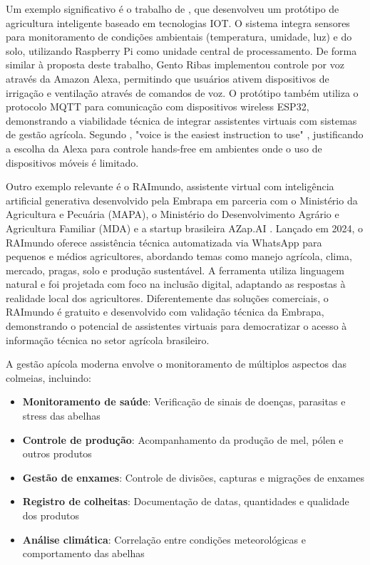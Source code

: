 Um exemplo significativo é o trabalho de \textcite{gento2019iot}, que desenvolveu um protótipo de agricultura inteligente baseado em tecnologias IOT. O sistema integra sensores para monitoramento de condições ambientais (temperatura, umidade, luz) e do solo, utilizando Raspberry Pi como unidade central de processamento. De forma similar à proposta deste trabalho, Gento Ribas implementou controle por voz através da Amazon Alexa, permitindo que usuários ativem dispositivos de irrigação e ventilação através de comandos de voz. O protótipo também utiliza o protocolo MQTT para comunicação com dispositivos wireless ESP32, demonstrando a viabilidade técnica de integrar assistentes virtuais com sistemas de gestão agrícola. Segundo \textcite{gento2019iot}, "voice is the easiest instruction to use" \cite[p. 45]{gento2019iot}, justificando a escolha da Alexa para controle hands-free em ambientes onde o uso de dispositivos móveis é limitado.

Outro exemplo relevante é o RAImundo, assistente virtual com inteligência artificial generativa desenvolvido pela Embrapa em parceria com o Ministério da Agricultura e Pecuária (MAPA), o Ministério do Desenvolvimento Agrário e Agricultura Familiar (MDA) e a startup brasileira AZap.AI \cite{embrapa2024raimundo}. Lançado em 2024, o RAImundo oferece assistência técnica automatizada via WhatsApp para pequenos e médios agricultores, abordando temas como manejo agrícola, clima, mercado, pragas, solo e produção sustentável. A ferramenta utiliza linguagem natural e foi projetada com foco na inclusão digital, adaptando as respostas à realidade local dos agricultores. Diferentemente das soluções comerciais, o RAImundo é gratuito e desenvolvido com validação técnica da Embrapa, demonstrando o potencial de assistentes virtuais para democratizar o acesso à informação técnica no setor agrícola brasileiro.


A gestão apícola moderna envolve o monitoramento de múltiplos aspectos das colmeias, incluindo:
\begin{itemize}
    \item \textbf{Monitoramento de saúde}: Verificação de sinais de doenças, parasitas e stress das abelhas
    \item \textbf{Controle de produção}: Acompanhamento da produção de mel, pólen e outros produtos
    \item \textbf{Gestão de enxames}: Controle de divisões, capturas e migrações de enxames
    \item \textbf{Registro de colheitas}: Documentação de datas, quantidades e qualidade dos produtos
    \item \textbf{Análise climática}: Correlação entre condições meteorológicas e comportamento das abelhas
\end{itemize}

